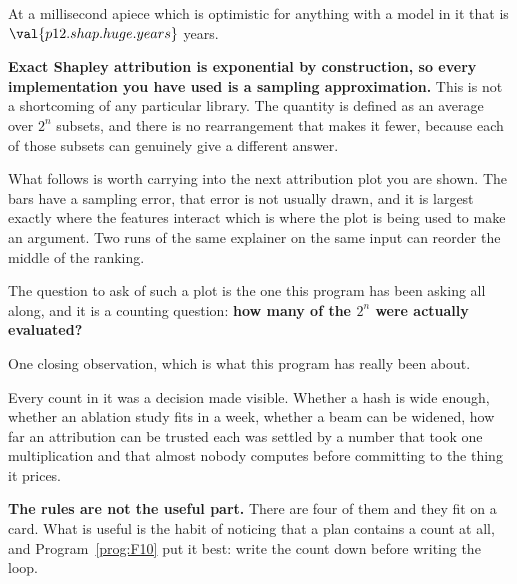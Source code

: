 \begin{fr}
At a millisecond apiece \dash{} which is optimistic for anything with a model
in it \dash{} that is $\val{p12.shap.huge.years}$ years.

\begin{trapbox}
\textbf{Exact Shapley attribution is exponential by construction, so every
implementation you have used is a sampling approximation.} This is not a
shortcoming of any particular library. The quantity is defined as an average
over $2^{n}$ subsets, and there is no rearrangement that makes it fewer,
because each of those subsets can genuinely give a different answer.

What follows is worth carrying into the next attribution plot you are shown.
The bars have a sampling error, that error is not usually drawn, and it is
largest exactly where the features interact \dash{} which is where the plot is
being used to make an argument. Two runs of the same explainer on the same
input can reorder the middle of the ranking.

The question to ask of such a plot is the one this program has been asking all
along, and it is a counting question: \textbf{how many of the
$2^{n}$ were actually evaluated?}
\end{trapbox}
\end{fr}

\begin{fr}
One closing observation, which is what this program has really been about.

Every count in it was a decision made visible. Whether a hash is wide enough,
whether an ablation study fits in a week, whether a beam can be widened, how
far an attribution can be trusted \dash{} each was settled by a number that
took one multiplication and that almost nobody computes before committing to
the thing it prices.

\textbf{The rules are not the useful part.} There are four of them and they
fit on a card. What is useful is the habit of noticing that a plan contains a
count at all, and Program~\ref{prog:F10} put it best: write the count down
before writing the loop.
\end{fr}

